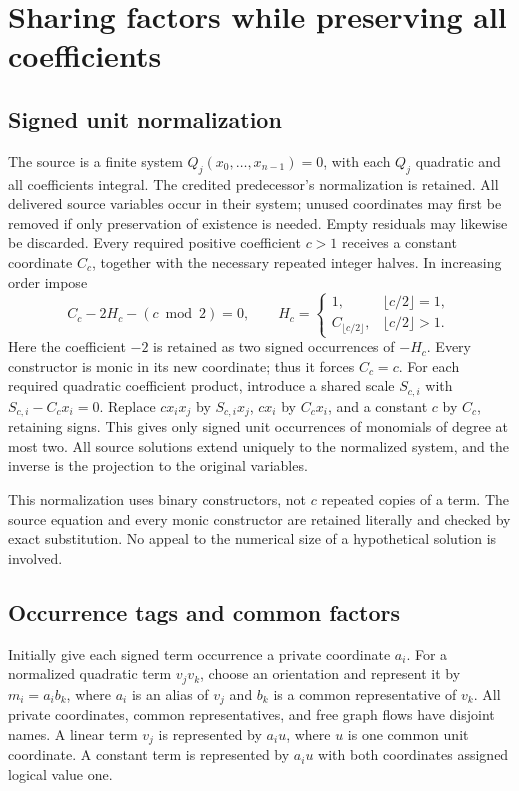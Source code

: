 \documentclass[11pt]{article}
\theoremstyle{definition}\newtheorem{definition}[theorem]{Definition}
\theoremstyle{remark}\newtheorem{remark}[theorem]{Remark}
\begin{document}
\section{Sharing factors while preserving all coefficients}
\label{sec:aliases}

\subsection{Signed unit normalization}
The source is a finite system $Q_j(x_0,\ldots,x_{n-1})=0$, with each $Q_j$
quadratic and all coefficients integral. The credited predecessor's
normalization is retained. All delivered source variables occur in their
system; unused coordinates may first be removed if only preservation of
existence is needed. Empty residuals may likewise be discarded. Every required
positive coefficient $c>1$ receives
a constant coordinate $C_c$, together with the necessary repeated integer
halves. In increasing order impose
\[
 C_c-2H_c-(c\bmod2)=0,\qquad
 H_c=\begin{cases}1,&\lfloor c/2\rfloor=1,\\
 C_{\lfloor c/2\rfloor},&\lfloor c/2\rfloor>1.
 \end{cases}
\]
Here the coefficient $-2$ is retained as two signed occurrences of $-H_c$.
Every constructor is monic in its new coordinate; thus it forces $C_c=c$.
For each required quadratic coefficient product, introduce a shared scale
$S_{c,i}$ with $S_{c,i}-C_cx_i=0$. Replace $cx_ix_j$ by $S_{c,i}x_j$,
$cx_i$ by $C_cx_i$, and a constant $c$ by $C_c$, retaining signs. This gives
only signed unit occurrences of monomials of degree at most two. All source
solutions extend uniquely to the normalized system, and the inverse is the
projection to the original variables.

This normalization uses binary constructors, not $c$ repeated copies of a term.
The source equation and every monic constructor are retained literally and
checked by exact substitution. No appeal to the numerical size of a hypothetical
solution is involved.

\subsection{Occurrence tags and common factors}
Initially give each signed term occurrence a private coordinate $a_i$.
For a normalized quadratic term $v_jv_k$, choose an orientation and represent
it by $m_i=a_i b_k$, where $a_i$ is an alias of $v_j$ and $b_k$ is a common
representative of $v_k$. All private coordinates, common representatives, and
free graph flows have disjoint names. A linear term $v_j$ is represented by
$a_i u$, where $u$ is one common unit coordinate. A constant term is represented
by $a_i u$ with both coordinates assigned logical value one.
\end{document}
